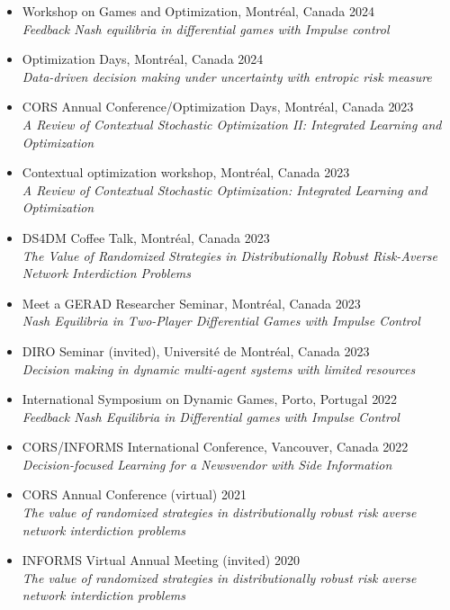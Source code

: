 \documentclass[12pt]{article}
\newenvironment{lonemidlist}[1][\enskip\textbullet]%
        {\begin{itemize}[#1,leftmargin=*,parsep=0pt,itemsep=5pt,topsep=2pt,partopsep=0pt]}
        {\end{itemize}\vspace{-.6\baselineskip}}
\begin{document}
\begin{lonemidlist}
\item Workshop on Games and Optimization, Montréal, Canada
\hfill{2024}\\
\textit{Feedback Nash equilibria in differential games with Impulse control}
\item Optimization Days, Montréal, Canada
\hfill{2024}\\
\textit{Data-driven decision making under uncertainty with entropic risk measure}
\item CORS Annual Conference/Optimization Days, Montréal, Canada
\hfill{2023}\\
\textit{A Review of Contextual Stochastic Optimization II: Integrated Learning and Optimization}
\item Contextual optimization workshop, Montréal, Canada
\hfill{2023}\\
\textit{A Review of Contextual Stochastic Optimization: Integrated Learning and Optimization}
\item  DS4DM Coffee Talk, Montréal, Canada
\hfill{2023}\\
\textit{The Value of Randomized Strategies in Distributionally Robust Risk-Averse Network Interdiction Problems}
\item  Meet a GERAD Researcher Seminar, Montréal, Canada \hfill{2023}\\
\textit{Nash Equilibria in Two-Player Differential Games with Impulse Control}
\item  DIRO Seminar (invited), Université de Montréal, Canada \hfill{2023}\\
\textit{Decision making in dynamic multi-agent systems with limited resources}
\item  International Symposium on Dynamic Games, Porto, Portugal
\hfill{2022}\\
\textit{Feedback Nash Equilibria in Differential games with Impulse Control}
\item  CORS/INFORMS International Conference, Vancouver, Canada \hfill{2022}\\
\textit{Decision-focused Learning for a Newsvendor with Side Information}
\item CORS Annual Conference  (virtual) \hfill{2021}\\
\textit{The value of randomized strategies in distributionally robust risk averse network interdiction problems}
\item INFORMS Virtual Annual Meeting (invited) \hfill{2020}\\
\textit{The value of randomized strategies in distributionally robust risk averse network interdiction problems}

\end{lonemidlist}
\end{document}
